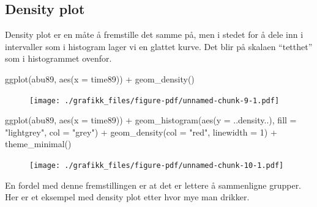 \documentclass[
  letterpaper,
  DIV=11,
  numbers=noendperiod]{scrreprt}
\newenvironment{Shaded}{\begin{snugshade}}{\end{snugshade}}
\newcommand{\AttributeTok}[1]{\textcolor[rgb]{0.40,0.45,0.13}{#1}}
\newcommand{\DecValTok}[1]{\textcolor[rgb]{0.68,0.00,0.00}{#1}}
\newcommand{\FunctionTok}[1]{\textcolor[rgb]{0.28,0.35,0.67}{#1}}
\newcommand{\NormalTok}[1]{\textcolor[rgb]{0.00,0.23,0.31}{#1}}
\newcommand{\SpecialCharTok}[1]{\textcolor[rgb]{0.37,0.37,0.37}{#1}}
\newcommand{\StringTok}[1]{\textcolor[rgb]{0.13,0.47,0.30}{#1}}
\theoremstyle{definition}
\theoremstyle{remark}
\begin{document}
\hypertarget{density-plot}{%
\subsection{Density plot}\label{density-plot}}

Density plot er en måte å fremstille det samme på, men i stedet for å
dele inn i intervaller som i histogram lager vi en glattet kurve. Det
blir på skalaen ``tetthet'' som i histogrammet ovenfor.

\begin{Shaded}
\begin{Highlighting}[]
\FunctionTok{ggplot}\NormalTok{(abu89, }\FunctionTok{aes}\NormalTok{(}\AttributeTok{x =}\NormalTok{ time89)) }\SpecialCharTok{+}
  \FunctionTok{geom\_density}\NormalTok{()}
\end{Highlighting}
\end{Shaded}

\begin{figure}[H]

{\centering \texttt{[image: ./grafikk\_files/figure-pdf/unnamed-chunk-9-1.pdf]}

}

\end{figure}

\begin{Shaded}
\begin{Highlighting}[]
\FunctionTok{ggplot}\NormalTok{(abu89, }\FunctionTok{aes}\NormalTok{(}\AttributeTok{x =}\NormalTok{ time89)) }\SpecialCharTok{+}
  \FunctionTok{geom\_histogram}\NormalTok{(}\FunctionTok{aes}\NormalTok{(}\AttributeTok{y =}\NormalTok{ ..density..), }\AttributeTok{fill =} \StringTok{"lightgrey"}\NormalTok{, }\AttributeTok{col =} \StringTok{"grey"}\NormalTok{) }\SpecialCharTok{+}
  \FunctionTok{geom\_density}\NormalTok{(}\AttributeTok{col =} \StringTok{"red"}\NormalTok{, }\AttributeTok{linewidth =} \DecValTok{1}\NormalTok{) }\SpecialCharTok{+}
  \FunctionTok{theme\_minimal}\NormalTok{()}
\end{Highlighting}
\end{Shaded}

\begin{figure}[H]

{\centering \texttt{[image: ./grafikk\_files/figure-pdf/unnamed-chunk-10-1.pdf]}

}

\end{figure}

En fordel med denne fremstillingen er at det er lettere å sammenligne
grupper. Her er et eksempel med density plot etter hvor mye man drikker.
\end{document}
